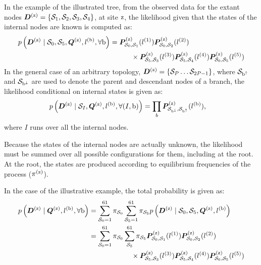 In the example of the illustrated tree, from the observed data for the extant nodes $\bm{D}^{(\text{z})} = \{ \mathcal{S}_1,\mathcal{S}_2, \mathcal{S}_3, \mathcal{S}_4 \}$, at site $\text{z}$, the likelihood given that the states of the internal nodes are known is computed as:
\begin{align}
    p\left(\bm{D}^{(\text{z})} \mid \mathcal{S}_0, \mathcal{S}_5, \bm{Q}^{(\text{z})}, l^{(\text{b})}, \forall \text{b} \right) & = \bm{P}^{(\text{z})}_{\mathcal{S}_0, \mathcal{S}_1}(l^{(1)})
    \bm{P}^{(\text{z})}_{\mathcal{S}_0, \mathcal{S}_2}(l^{(2)}) \\
    & \quad \quad \quad
    \times \bm{P}^{(\text{z})}_{\mathcal{S}_5, \mathcal{S}_3}(l^{(3)})
    \bm{P}^{(\text{z})}_{\mathcal{S}_5, \mathcal{S}_4}(l^{(4)})
    \bm{P}^{(\text{z})}_{\mathcal{S}_0, \mathcal{S}_5}(l^{(5)}) \notag
\end{align}
In the general case of an arbitrary topology, $\bm{D}^{(\text{z})} = \{ \mathcal{S}_P \hdots \mathcal{S}_{2P-1} \}$, where $\mathcal{S}_{\text{b}^{\uparrow}}$ and $\mathcal{S}_{\text{b}^{\downarrow}}$ are used to denote the parent and descendant nodes of a branch, the likelihood conditional on internal states is given as:
\begin{align}
    p\left(\bm{D}^{(\text{z})} \mid \mathcal{S}_{I}, \bm{Q}^{(\text{z})}, l^{(\text{b})}, \forall (I, \text{b}) \right) & = \prod_{b} \bm{P}^{(\text{z})}_{\mathcal{S}_{\text{b}^{\downarrow}}, \mathcal{S}_{\text{b}^{\uparrow}}}(l^{(\text{b})}),
\end{align}
where $I$ runs over all the internal nodes.

Because the states of the internal nodes are actually unknown, the likelihood must be summed over all possible configurations for them, including at the root.
At the root, the states are produced according to equilibrium frequencies of the process ($\pi^{(\text{z})}$).

In the case of the illustrative example, the total probability is given as:
\begin{align}
    p\left(\bm{D}^{(\text{z})} \mid \bm{Q}^{(\text{z})}, l^{(\text{b})} , \forall \text{b} \right) & = \sum\limits_{\mathcal{S}_0=1}^{61} \pi_{\mathcal{S}_0} \sum\limits_{\mathcal{S}_5=1}^{61} \pi_{\mathcal{S}_5} p\left(\bm{D}^{(\text{z})} \mid \mathcal{S}_0, \mathcal{S}_5, \bm{Q}^{(\text{z})}, l^{(\text{b})} \right) \\
    & = \sum\limits_{\mathcal{S}_0=1}^{61} \pi_{\mathcal{S}_0} \sum\limits_{\mathcal{S}_5}^{61} \pi_{\mathcal{S}_5} \bm{P}^{(\text{z})}_{\mathcal{S}_0, \mathcal{S}_1}(l^{(1)})
    \bm{P}^{(\text{z})}_{\mathcal{S}_0, \mathcal{S}_2}(l^{(2)}) \\
    & \qquad \qquad \qquad
    \times \bm{P}^{(\text{z})}_{\mathcal{S}_5, \mathcal{S}_3}(l^{(3)})
    \bm{P}^{(\text{z})}_{\mathcal{S}_5, \mathcal{S}_4}(l^{(4)})
    \bm{P}^{(\text{z})}_{\mathcal{S}_0, \mathcal{S}_5}(l^{(5)})\notag
\end{align}

